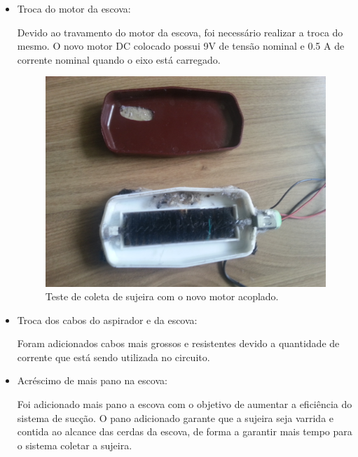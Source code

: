    \begin{itemize}
      \item Troca do motor da escova:

         Devido ao travamento do motor da escova, foi necessário realizar a troca do mesmo. O novo motor DC colocado possui 9V de tensão nominal e 0.5 A de corrente nominal quando o eixo está carregado.

         \begin{figure}[H]                                                           
            \centering                                                                
            \includegraphics[scale=0.1]{figuras/SuccaoPC3_1.jpg}               
            \caption{Teste de coleta de sujeira com o novo motor acoplado.}    
            \label{img:teste_coleta}                                            
         \end{figure} 

      \item Troca dos cabos do aspirador e da escova:

         Foram adicionados cabos mais grossos e resistentes devido a quantidade de corrente que está sendo utilizada no circuito. 

      \item Acréscimo de mais pano na escova:

         Foi adicionado mais pano a escova com o objetivo de aumentar a eficiência do sistema de sucção. O pano adicionado garante que a sujeira seja varrida e contida ao alcance das cerdas da escova, de forma a garantir mais tempo para o sistema coletar a sujeira.


\end{itemize}
